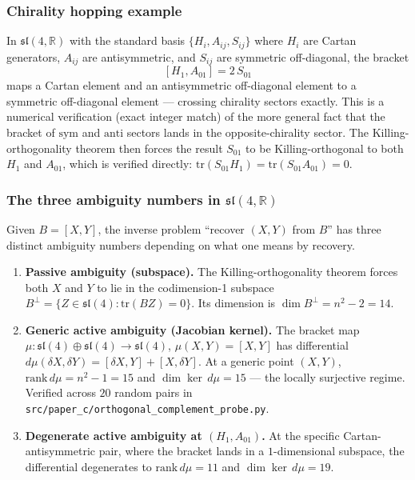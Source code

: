 \documentclass[11pt,a4paper]{article}
\theoremstyle{plain}
\theoremstyle{definition}
\theoremstyle{remark}
\begin{document}
\subsubsection*{Chirality hopping example}

In $\mathfrak{sl}(4,\mathbb{R})$ with the standard basis
$\{H_i, A_{ij}, S_{ij}\}$ where $H_i$ are Cartan generators,
$A_{ij}$ are antisymmetric, and $S_{ij}$ are symmetric off-diagonal,
the bracket
\begin{equation}\label{eq:chirality-hopping}
  [H_1, A_{01}] = 2\,S_{01}
\end{equation}
maps a Cartan element and an antisymmetric off-diagonal element to
a symmetric off-diagonal element --- crossing chirality sectors
exactly.  This is a numerical verification (exact integer match) of
the more general fact that the bracket of $\mathrm{sym}$ and
$\mathrm{anti}$ sectors lands in the opposite-chirality sector.
The Killing-orthogonality theorem then forces the result $S_{01}$ to
be Killing-orthogonal to both $H_1$ and $A_{01}$, which is verified
directly: $\mathrm{tr}(S_{01} H_1) = \mathrm{tr}(S_{01} A_{01}) = 0$.

\subsubsection*{The three ambiguity numbers in \texorpdfstring{$\mathfrak{sl}(4,\mathbb{R})$}{sl(4,R)}}

Given $B = [X, Y]$, the inverse problem ``recover $(X, Y)$ from $B$''
has three distinct ambiguity numbers depending on what one means by
recovery.

\begin{enumerate}[label=(\alph*)]
  \item \textbf{Passive ambiguity (subspace).}
    The Killing-orthogonality theorem forces both $X$ and $Y$ to lie
    in the codimension-1 subspace
    \(
      B^\perp = \{Z \in \mathfrak{sl}(4) : \mathrm{tr}(BZ) = 0\}.
    \)
    Its dimension is $\dim B^\perp = n^2 - 2 = 14$.
  \item \textbf{Generic active ambiguity (Jacobian kernel).}
    The bracket map $\mu : \mathfrak{sl}(4) \oplus \mathfrak{sl}(4) \to \mathfrak{sl}(4)$,
    $\mu(X, Y) = [X, Y]$ has differential
    $d\mu(\delta X, \delta Y) = [\delta X, Y] + [X, \delta Y]$.
    At a generic point $(X, Y)$, $\mathrm{rank}\,d\mu = n^2 - 1 = 15$
    and $\dim \ker\,d\mu = 15$ --- the locally surjective regime.
    Verified across $20$ random pairs in
    \nolinkurl{src/paper_c/orthogonal_complement_probe.py}.
  \item \textbf{Degenerate active ambiguity at $(H_1, A_{01})$.}
    At the specific Cartan-antisymmetric pair, where the bracket lands
    in a $1$-dimensional subspace, the differential degenerates to
    $\mathrm{rank}\,d\mu = 11$ and $\dim \ker\,d\mu = 19$.
\end{enumerate}
\end{document}
